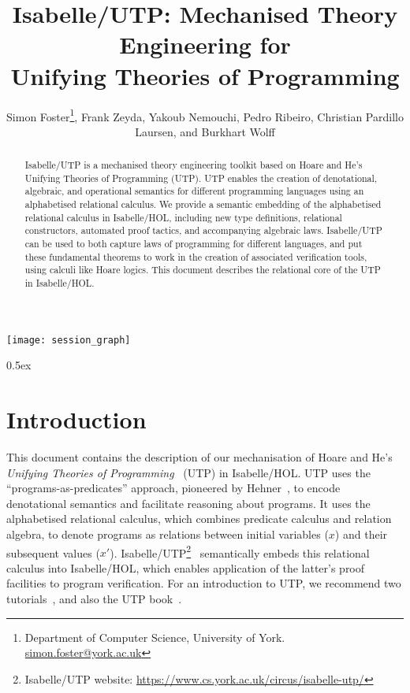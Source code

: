 \documentclass[11pt,a4paper]{article}
\begin{document}
\title{Isabelle/UTP: Mechanised Theory Engineering for \\ Unifying Theories of Programming}

\author{Simon Foster\footnote{Department of Computer Science, University of York. \href{mailto:simon.foster@york.ac.uk}{simon.foster@york.ac.uk}}, Frank Zeyda, Yakoub Nemouchi, Pedro Ribeiro, Christian Pardillo Laursen, and Burkhart Wolff}

\maketitle

\begin{abstract}
  Isabelle/UTP is a mechanised theory engineering toolkit based on Hoare and He's Unifying Theories of Programming
  (UTP). UTP enables the creation of denotational, algebraic, and operational semantics for different programming
  languages using an alphabetised relational calculus. We provide a semantic embedding of the alphabetised relational
  calculus in Isabelle/HOL, including new type definitions, relational constructors, automated proof tactics, and
  accompanying algebraic laws. Isabelle/UTP can be used to both capture laws of programming for different languages, and
  put these fundamental theorems to work in the creation of associated verification tools, using calculi like Hoare
  logics. This document describes the relational core of the UTP in Isabelle/HOL.
\end{abstract}

\tableofcontents

\begin{center}
  \texttt{[image: session\_graph]}
\end{center}

\parindent 0pt\parskip 0.5ex

\section{Introduction}

This document contains the description of our mechanisation of Hoare and He's \emph{Unifying Theories of
  Programming}~\cite{Hoare&98,Cavalcanti&06} (UTP) in Isabelle/HOL. UTP uses the ``programs-as-predicates'' approach, 
pioneered by Hehner~\cite{Hehner1988,Hehner1990,Hehner93}, to encode denotational semantics and facilitate reasoning about programs. 
It uses the alphabetised relational calculus, which combines predicate calculus and relation algebra, to denote programs as relations 
between initial variables ($x$) and their subsequent values ($x'$). Isabelle/UTP\footnote{Isabelle/UTP website:
  \url{https://www.cs.york.ac.uk/circus/isabelle-utp/}}~\cite{Foster16a,Foster16c,Foster14c} semantically embeds this
relational calculus into Isabelle/HOL, which enables application of the latter's proof facilities to program
verification. For an introduction to UTP, we recommend two tutorials~\cite{Cavalcanti04,Cavalcanti&06}, and also the UTP
book~\cite{Hoare&98}.
\end{document}
